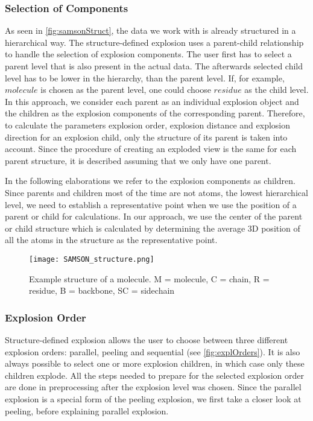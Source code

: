 \documentclass[draft,final]{vutinfth} %
\begin{document}
\subsubsection{Selection of Components}
\label{subsubsec:explcompsStruc} 
As seen in \autoref{fig:samsonStruct}, the data we work with is already structured in a hierarchical way. 
The structure-defined explosion uses a parent-child relationship to handle the selection of explosion components. The user first has to select a parent level that is also present in the actual data. 
The afterwards selected child level has to be lower in the hierarchy, than the parent level. If, for example, \(molecule\) is chosen as the parent level, one could choose \(residue\) as the child level. 
In this approach, we consider each parent as an individual explosion object and the children as the explosion components of the corresponding parent. 
Therefore, to calculate the parameters explosion order, explosion distance and explosion direction for an explosion child, only the structure of its parent is taken into account. 
Since the procedure of creating an exploded view is the same for each parent structure, it is described assuming that we only have one parent.

\par In the following elaborations we refer to the explosion components as children. Since parents and children most of the time are not atoms, the lowest hierarchical level, we need to establish a representative point when we use the position of a parent or child for calculations. In our approach, we use the center of the parent or child structure which is calculated by determining the average 3D position of all the atoms in the structure as the representative point.

\begin{figure}
\centering
\texttt{[image: SAMSON\_structure.png]}
\caption{Example structure of a molecule. M = molecule, C = chain, R = residue, B = backbone, SC = sidechain}
\label{fig:samsonStruct}
\end{figure}

\subsubsection{Explosion Order}
\label{subsubsec:explOrderStruc}
Structure-defined explosion allows the user to choose between three different explosion orders: parallel, peeling and sequential (see \autoref{fig:explOrders}). 
It is also always possible to select one or more explosion children, in which case only these children explode. All the steps needed to prepare for the selected explosion order are done in preprocessing after the explosion level was chosen. Since the parallel explosion is a special form of the peeling explosion, we first take a closer look at peeling, before explaining parallel explosion.
\end{document}
